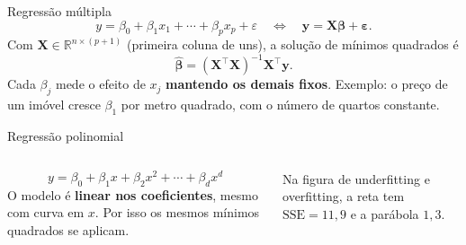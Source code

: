 \documentclass[10pt]{beamer}
\begin{document}
\begin{frame}{Regressão múltipla}
\[ y=\beta_0+\beta_1x_1+\cdots+\beta_px_p+\varepsilon \quad\Longleftrightarrow\quad \mathbf{y}=\mathbf{X}\boldsymbol\beta+\boldsymbol\varepsilon. \]
Com $\mathbf{X}\in\mathbb{R}^{n\times(p+1)}$ (primeira coluna de uns), a solução de mínimos quadrados é
\[ \hat{\boldsymbol\beta}=(\mathbf{X}^\top\mathbf{X})^{-1}\mathbf{X}^\top\mathbf{y}. \]
Cada $\beta_j$ mede o efeito de $x_j$ \textbf{mantendo os demais fixos}. Exemplo: o preço de um imóvel cresce $\beta_1$ por metro quadrado, com o número de quartos constante.
\end{frame}

\begin{frame}{Regressão polinomial}
\begin{columns}[c]
\[ y=\beta_0+\beta_1x+\beta_2x^2+\cdots+\beta_dx^d \]
O modelo é \textbf{linear nos coeficientes}, mesmo com curva em $x$. Por isso os mesmos mínimos quadrados se aplicam.

\vspace{2mm}
\small Na figura de underfitting e overfitting, a reta tem $\text{SSE}=11{,}9$ e a parábola $1{,}3$.
\end{columns}
\end{frame}
\end{document}

